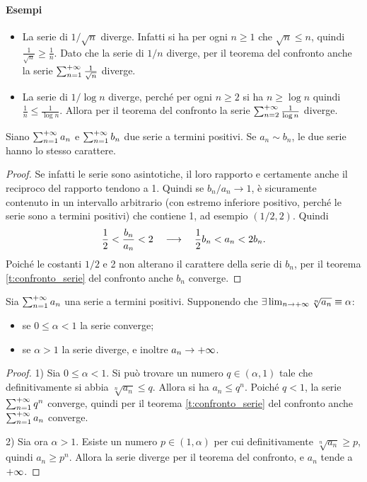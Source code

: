\paragraph{Esempi}
\begin{itemize}
\item La serie di $1/\sqrt{n}$ diverge. Infatti si ha per ogni $n\geq 1$ che $\sqrt{n}\leq n$, quindi $\frac1{\sqrt{n}}\geq\frac1{n}$. Dato che la serie di $1/n$ diverge, per il teorema del confronto anche la serie $\sum_{{n}=1}^{+\infty}\frac1{\sqrt{n}}$ diverge.
\item La serie di $1/\log n$ diverge, perché per ogni $n\geq 2$ si ha $n\geq\log n$ quindi $\frac1{n}\leq\frac1{\log n}$. Allora per il teorema del confronto la serie $\sum_{n=2}^{+\infty}\frac1{\log n}$ diverge.
\end{itemize}
\begin{corollario}
\label{c:confronto_asintotico}
Siano $\sum_{{n}=1}^{+\infty}a_n$ e $\sum_{{n}=1}^{+\infty}b_n$ due serie a termini positivi. Se $a_n\sim b_n$, le due serie hanno lo stesso carattere.
\begin{proof}
Se infatti le serie sono asintotiche, il loro rapporto e certamente anche il reciproco del rapporto tendono a 1. Quindi se $b_n/a_n\to 1$, è sicuramente contenuto in un intervallo arbitrario (con estremo inferiore positivo, perché le serie sono a termini positivi) che contiene 1, ad esempio $(1/2,2)$. Quindi
\[
\frac12<\frac{b_n}{a_n}<2\quad\longrightarrow\quad\frac12b_n<a_n<2b_n.
\]
Poiché le costanti $1/2$ e 2 non alterano il carattere della serie di $b_n$, per il teorema \ref{t:confronto_serie} del confronto anche $b_n$ converge.
\end{proof}
\end{corollario}
\begin{teorema}
\label{t:criterio_radice_serie}
Sia $\sum_{{n}=1}^{+\infty}a_n$ una serie a termini positivi. Supponendo che $\exists\lim_{n\to+\infty}\sqrt[n]{a_n}\equiv\alpha$:
\begin{itemize}
\item se $0\leq\alpha<1$ la serie converge;
\item se $\alpha>1$ la serie diverge, e inoltre $a_n\to+\infty$.
\end{itemize}
\end{teorema}
\begin{proof}
1) Sia $0\leq\alpha<1$. Si può trovare un numero $q\in(\alpha,1)$ tale che definitivamente si abbia $\sqrt[n]{a_n}\leq q$. Allora si ha $a_n\leq q^n$. Poiché $q<1$, la serie $\sum_{{n}=1}^{+\infty}q^n$ converge, quindi per il teorema \ref{t:confronto_serie} del confronto anche $\sum_{{n}=1}^{+\infty}a_n$ converge.

2) Sia ora $\alpha>1$. Esiste un numero $p\in(1,\alpha)$ per cui definitivamente $\sqrt[n]{a_n}\geq p$, quindi $a_n\geq p^n$. Allora la serie diverge per il teorema del confronto, e $a_n$ tende a $+\infty$.
\end{proof}
